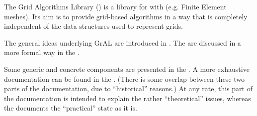 The Grid Algorithms Library ()
is a library for  
with  (e.g. Finite Element meshes).
Its aim is to provide grid-based algorithms in a way 
that is completely independent of the data structures
used to represent grids.


The general ideas underlying GrAL
are introduced in .
The  are discussed 
in a more formal way in the .

Some generic and concrete components are presented in the 
.
A more exhaustive documentation can be found 
in the .
(There is some overlap between these two parts of the documentation,
due to ``historical'' reasons.)
At any rate, this part of the documentation is intended to
explain the rather ``theoretical'' issues,
whereas the 
documents the ``practical'' state as it is.
